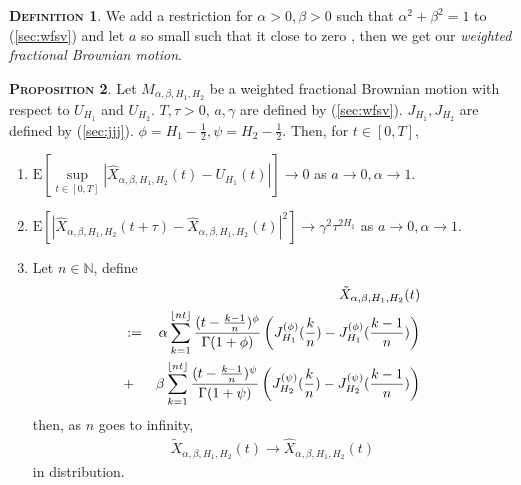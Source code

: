 \documentclass[a4paper, twoside, 11pt]{article}
\theoremstyle{definition}
\newtheorem{definition}{\scshape Definition}[section]
\newtheorem{proposition}[definition]{\scshape Proposition}
\DeclarePairedDelimiter\floor{\lfloor}{\rfloor}
\newcommand{\brkt}[1]{\left({#1} \right)}
\begin{document}
  \begin{definition}
	We add a restriction for $\alpha > 0, \beta > 0$ such that $\alpha^2 + \beta^2 = 1$ to (\ref{sec:wfsv}) and let $a$ so small such that it close to zero , then we get our \emph{weighted fractional Brownian motion}.
  \end{definition}
  
\begin{proposition}
  Let $M_{\alpha,\beta,H_1,H_2}$ be a weighted fractional Brownian motion with \\respect to $U_{H_1}$ and $U_{H_2}$. $T, \tau>0$, $a, \gamma$ are defined by (\ref{sec:wfsv}). $J_{H_1}, J_{H_2}$ are defined by (\ref{sec:jjj}). $\phi=H_1-\frac{1}{2}, \psi=H_2-\frac{1}{2}$. Then, for $t\in [0, T]$,
\begin{enumerate}[topsep=0pt, itemsep=-1ex, partopsep=1ex, parsep=1ex, label=(\roman*)]	
  \item $\mathrm{E}[\sup\limits_{t\in[0,T]}|\hat{X}_{\alpha,\beta,H_1,H_2}(t) - U_{H_1}(t)|] \rightarrow 0$
	as $a\rightarrow 0, \alpha\rightarrow 1$.
  \item $\mathrm{E}[|\hat{X}_{\alpha,\beta,H_1,H_2}(t+\tau) - \hat{X}_{\alpha,\beta,H_1,H_2}(t)|^2] \rightarrow  \gamma^2 \tau^{2H_1}$
	as $a\rightarrow 0, \alpha\rightarrow 1$.
  \item Let $n\in \mathbb{N}$, define
	\begin{eqnarray*}
	  &&\tilde{X}_{\alpha,\beta,H_1,H_2}(t) \\
	  &:=&  \alpha\sum_{k=1}^{\floor{nt}} \frac{(t - \frac{k-1}{n})^\phi}{\Gamma(1+\phi)} \brkt{J_{H_1}^{(\phi)}(\frac{k}{n}) - J_{H_1}^{(\phi)}(\frac{k-1}{n})} \\
	  &+& \beta\sum_{k=1}^{\floor{nt}} \frac{(t - \frac{k-1}{n})^\psi}{\Gamma(1+\psi)} \brkt{J_{H_2}^{(\psi)}(\frac{k}{n}) - J_{H_2}^{(\psi)}(\frac{k-1}{n})}
	  \label{sec:disc}
	\end{eqnarray*}
	then, as $n$ goes to infinity,
	\begin{eqnarray*}
	  \tilde{X}_{\alpha,\beta,H_1,H_2}(t) \rightarrow \hat{X}_{\alpha,\beta,H_1,H_2}(t)
	\end{eqnarray*}
	in distribution.
  \end{enumerate}
  \end{proposition}
\end{document}
